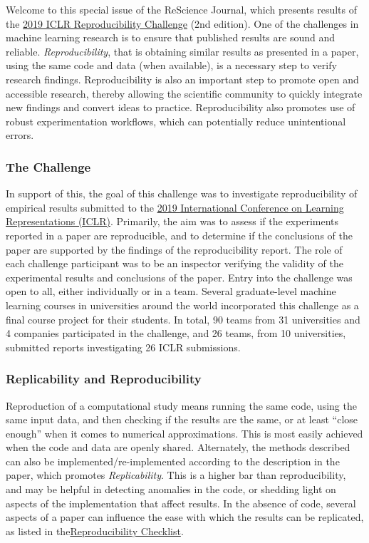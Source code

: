 Welcome to this special issue of the ReScience Journal, which presents results of the \href{https://reproducibility-challenge.github.io/iclr_2019/}{2019 ICLR Reproducibility Challenge} (2nd edition). One of the challenges in machine learning research is to ensure that published results are sound and reliable. \textit{Reproducibility}, that is obtaining similar results as presented in a paper, using the same code and data (when available), is a necessary step to verify research findings. Reproducibility is also an important step to promote open and accessible research, thereby allowing the scientific community to quickly integrate new findings and convert ideas to practice.  Reproducibility also promotes use of robust experimentation workflows, which can potentially reduce unintentional errors.

\subsubsection{The Challenge} 

In support of this, the goal of this challenge was to investigate reproducibility of empirical results submitted to the \href{https://iclr.cc/}{2019 International Conference on Learning Representations (ICLR)}. Primarily, the aim was to assess if the experiments reported in a paper are reproducible, and to determine if the conclusions of the paper are supported by the findings of the reproducibility report. The role of each challenge participant was to be an inspector verifying the validity of the experimental results and conclusions of the paper.  Entry into the challenge was open to all, either individually or in a team.  Several graduate-level machine learning courses in universities around the world incorporated this challenge as a final course project for their students.   In total, 90 teams from 31 universities and 4 companies participated in the challenge, and 26 teams, from 10 universities, submitted reports investigating 26 ICLR submissions.

\subsubsection{Replicability and Reproducibility} 

Reproduction of a computational study means running the same code, using the same input data, and then checking if the results are the same, or at least “close enough” when it comes to numerical approximations. This is most easily achieved when the code and data are openly shared.  Alternately, the methods described can also be implemented/re-implemented according to the description in the paper, which promotes \textit{Replicability}. This is a higher bar than reproducibility, and may be helpful in detecting anomalies in the code, or shedding light on aspects of the implementation that affect results.  In the absence of code, several aspects of a paper can influence the ease with which the results can be replicated, as listed in the\href{https://www.cs.mcgill.ca/~jpineau/ReproducibilityChecklist.pdf}{Reproducibility Checklist}. 

